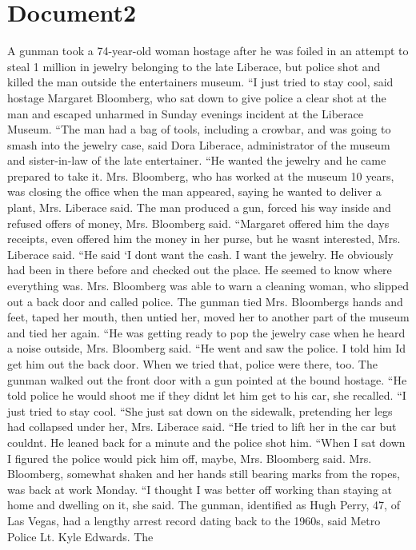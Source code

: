 \documentclass{article}
\begin{document}
\color[rgb]{0,0,0}\section{Document2}
\color[rgb]{0.29411764705882354,0.3686274509803922,0.5058823529411764}A gunman took a 74-year-old woman hostage after he was foiled in an attempt to steal 1 million in jewelry belonging to the late Liberace, but police shot and killed the man outside the entertainers museum. ``I just tried to stay cool, said hostage Margaret Bloomberg, who sat down to give police a clear shot at the man and escaped unharmed in Sunday evenings incident at the Liberace Museum. ``The man had a bag of tools, including a crowbar, and was going to smash into the jewelry case, said Dora Liberace, administrator of the museum and sister-in-law of the late entertainer. ``He wanted the jewelry and he came prepared to take it. Mrs. Bloomberg, who has worked at the museum 10 years, was closing the office when the man appeared, saying he wanted to deliver a plant, Mrs. Liberace said. The man produced a gun, forced his way inside and refused offers of money, Mrs. Bloomberg said. ``Margaret offered him the days receipts, even offered him the money in her purse, but he wasnt interested, Mrs. Liberace said. ``He said `I dont want the cash. I want the jewelry. He obviously had been in there before and checked out the place. He seemed to know where everything was. Mrs. Bloomberg was able to warn a cleaning woman, who slipped out a back door and called police. The gunman tied Mrs. Bloombergs hands and feet, \color[rgb]{0.9372549019607843,0.48627450980392156,0.396078431372549}taped \color[rgb]{0.29411764705882354,0.3686274509803922,0.5058823529411764}her mouth, then untied her, moved her to another part of the museum and tied her again. ``He was getting ready to pop the jewelry case when he heard a noise outside, Mrs. Bloomberg said. ``He went and saw the police. I told him Id get him out the back door. When we tried that, police were there, too. The gunman walked out the front door with a gun pointed at the bound hostage. ``He told police he would shoot me if they didnt let him get to his car, she recalled. ``I just tried to stay cool. ``She just sat down on the sidewalk, pretending her legs had collapsed under her, Mrs. Liberace said. ``He tried to lift her in the car but couldnt. He leaned back for a minute and the police shot him. ``When I sat down I figured the police would pick him off, maybe, Mrs. Bloomberg said. Mrs. Bloomberg, \color[rgb]{0.9372549019607843,0.48627450980392156,0.396078431372549}somewhat \color[rgb]{0.29411764705882354,0.3686274509803922,0.5058823529411764}shaken and her hands still bearing \color[rgb]{0.9372549019607843,0.48627450980392156,0.396078431372549}marks from the ropes, was \color[rgb]{0.29411764705882354,0.3686274509803922,0.5058823529411764}back at work Monday. ``I thought I was better off working than staying at home and dwelling on it, she said. The gunman, identified as Hugh Perry, 47, of Las Vegas, had a lengthy arrest \color[rgb]{0.9372549019607843,0.48627450980392156,0.396078431372549}record dating \color[rgb]{0.29411764705882354,0.3686274509803922,0.5058823529411764}back to the 1960s, said Metro Police Lt. Kyle Edwards. The 
\end{document}
